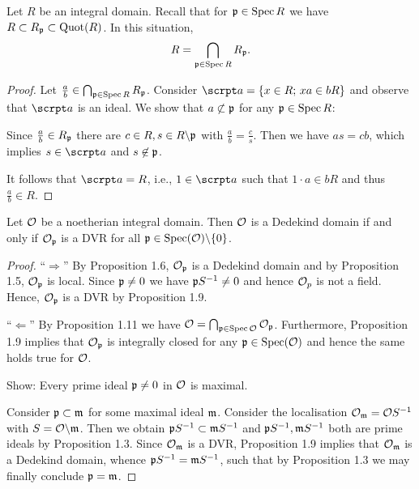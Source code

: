 \begin{Prop}
Let $R$ be an integral domain. Recall that for $\mathfrak{p} \in \operatorname{Spec} R$ we have $R \subset R_{\mathfrak{p}} \subset \operatorname{Quot}(R)$. In this situation,
\[ R = \bigcap_{\mathfrak{p}\in\operatorname{Spec} R} R_{\mathfrak{p}}.
\]
\end{Prop}

\begin{proof}
	Let $\frac{a}{b} \in \bigcap_{\mathfrak{p}\in\operatorname{Spec} R} R_{\mathfrak{p}}$. Consider $\a = \{x \in R; \, xa \in bR \}$ and observe that $\a$ is an ideal. We show that $a \not \subset \mathfrak{p}$ for any $\mathfrak{p} \in \operatorname{Spec} R$:
	
	Since $\frac{a}{b} \in R_{\mathfrak{p}}$ there are $c \in R, s \in R \backslash \mathfrak{p}$ with $\frac{a}{b} = \frac{c}{s}$.
	Then we have $as = cb$, which implies $s \in \a$ and $s \not \in \mathfrak{p}$.
	
	\bigskip It follows that $\a = R$, i.e., $1 \in \a $ such that $1\cdot a \in bR$ and thus $\frac{a}{b} \in R$.
\end{proof}

\begin{Satz} 
	Let $\mathcal{O}$ be a noetherian integral domain. Then $\mathcal{O}$ is a Dedekind domain if and only if $\mathcal{O}_{\mathfrak{p}}$ is a DVR for all $\mathfrak{p} \in \operatorname{Spec}(\mathcal{O}) \backslash \{ 0 \}$.
\end{Satz}

\begin{proof}
\enquote{$\Rightarrow$} 
By Proposition 1.6, $\mathcal{O}_{\mathfrak{p}}$ is a Dedekind domain and by Proposition 1.5, $\mathcal{O}_{\mathfrak{p}}$ is local.
Since $\mathfrak{p} \neq 0$ we have $\mathfrak{p} S^{-1} \neq 0$ and hence $\mathcal{O}_p$ is not a field. Hence, $\mathcal{O}_{\mathfrak{p}}$ is a DVR by Proposition 1.9.

\bigskip \enquote{$\Leftarrow$}
By Proposition 1.11 we have $\mathcal{O} = \bigcap_{\mathfrak{p}\in\operatorname{Spec} \mathcal{O}} \mathcal{O}_{\mathfrak{p}}$. Furthermore, Proposition 1.9 implies that $\mathcal{O}_{\mathfrak{p}}$ is integrally closed for any $\mathfrak{p} \in \operatorname{Spec}(\mathcal{O})$ and hence the same holds true for $\mathcal{O}$.

\bigskip
Show: Every prime ideal $\mathfrak{p} \neq 0$ in $\mathcal{O}$ is maximal.

Consider $\mathfrak{p} \subset \mathfrak{m}$ for some maximal ideal $\mathfrak{m}$. Consider the localisation $\mathcal{O}_{\mathfrak{m}} = \mathcal{O} S^{-1}$ with $S = \mathcal{O} \backslash \mathfrak{m}$. Then we obtain $\mathfrak{p} S^{-1} \subset \mathfrak{m} S^{-1}$ and $\mathfrak{p} S^{-1}, \mathfrak{m} S^{-1}$ both are prime ideals by Proposition 1.3.
Since $\mathcal{O}_{\mathfrak{m}}$ is a DVR, Proposition 1.9 implies that $\mathcal{O}_{\mathfrak{m}}$ is a Dedekind domain, whence
$\mathfrak{p} S^{-1} = \mathfrak{m} S^{-1}$, such that by Proposition 1.3 we may finally conclude $\mathfrak{p} = \mathfrak{m}$.
\end{proof}














